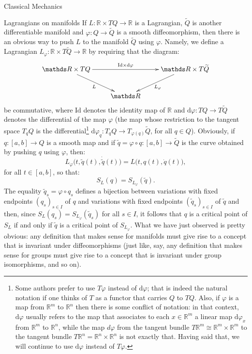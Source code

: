 \documentclass[oneside,a4paper,11pt]{amsbook}
\newcommand{\R}{\mathds R}
\newcommand{\dd}{\mathrm d}
\newcommand{\Id}{\mathrm{Id}}
\theoremstyle{remark}\newtheorem{exercise}{Exercise}[chapter]
\theoremstyle{plain}\newtheorem{teo}{Theorem}[section]
\theoremstyle{plain}\newtheorem{lem}[teo]{Lemma}
\theoremstyle{plain}\newtheorem{prop}[teo]{Proposition}
\theoremstyle{plain}\newtheorem{cor}[teo]{Corollary}
\theoremstyle{definition}\newtheorem{defin}[teo]{Definition}
\theoremstyle{remark}\newtheorem{rem}[teo]{Remark}
\theoremstyle{definition}\newtheorem{notation}[teo]{Notation}
\theoremstyle{definition}\newtheorem{convention}[teo]{Convention}
\theoremstyle{definition}\newtheorem{example}[teo]{Example}
\numberwithin{section}{chapter}
\numberwithin{equation}{section}
\begin{document}
\begin{chapter}{Classical Mechanics}
\begin{section}{Lagrangians on manifolds}
If $L:\R\times TQ\to\R$ is a Lagrangian, $\widetilde Q$ is another differentiable manifold and $\varphi:Q\to\widetilde Q$
is a smooth diffeomorphism, then there is an obvious way to push $L$ to the manifold $\widetilde Q$ using $\varphi$.
Namely, we define a Lagrangian $L_\varphi:\R\times T\widetilde Q\to\R$ by requiring
that the diagram:
\[\xymatrix{%
\R\times TQ\ar[rr]^{\Id\times\dd\varphi}\ar[dr]_L&&\R\times T\widetilde Q\ar[dl]^{L_\varphi}\\
&\R}\]
be commutative, where $\Id$ denotes the identity map of $\R$ and $\dd\varphi:TQ\to T\widetilde Q$ denotes the differential
of the map $\varphi$ (the map whose restriction to the tangent space $T_qQ$ is the differential\footnote{%
Some authors prefer to use $T\varphi$ instead of $\dd\varphi$; that is indeed the natural notation if one thinks of $T$
as a functor that carries $Q$ to $TQ$. Also, if $\varphi$ is a map from $\R^m$ to $\R^n$
then there is some conflict of notation: in that context, $\dd\varphi$ usually refers to the map that associates to each
$x\in\R^m$ a linear map $\dd\varphi_x$ from $\R^m$ to $\R^n$, while the map $d\varphi$ from the tangent bundle $T\R^m\cong
\R^m\times\R^m$ to the tangent bundle $T\R^n=\R^n\times\R^n$ is not exactly that. Having said that, we will continue to
use $\dd\varphi$ instead of $T\varphi$.}
$\dd\varphi_q:T_qQ\to T_{\varphi(q)}\widetilde Q$, for all $q\in Q$). Obviously, if $q:[a,b]\to Q$ is a smooth
map and if $\tilde q=\varphi\circ q:[a,b]\to\widetilde Q$ is the curve obtained by pushing $q$ using $\varphi$, then:
\[L_\varphi\big(t,\tilde q(t),\dot{\tilde q}(t)\big)=L\big(t,q(t),\dot q(t)\big),\]
for all $t\in[a,b]$, so that:
\[S_L(q)=S_{L_\varphi}(\tilde q).\]
The equality $\tilde q_s=\varphi\circ q_s$ defines a bijection between variations with fixed endpoints
$(q_s)_{s\in I}$ of $q$ and variations with fixed endpoints $(\tilde q_s)_{s\in I}$ of $\tilde q$ and then,
since $S_L(q_s)=S_{L_\varphi}(\tilde q_s)$ for all $s\in I$, it follows that $q$ is a critical point
of $S_L$ if and only if $\tilde q$ is a critical point of $S_{L_\varphi}$. What we have just observed is
pretty obvious: any definition that makes sense for manifolds must give rise to a concept that is invariant
under diffeomorphisms (just like, say, any definition that makes sense for groups must give rise to a concept
that is invariant under group isomorphisms, and so on).


\end{section}
\end{chapter}
\end{document}
